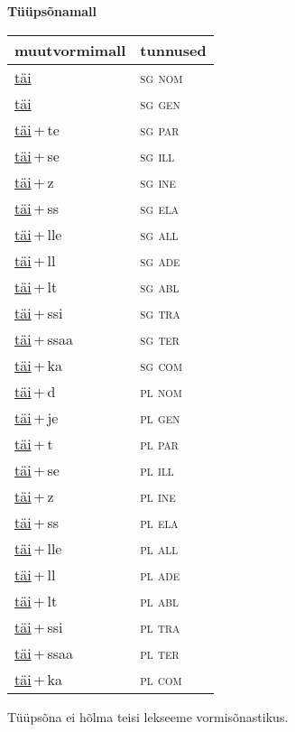 
\vspace{1.8em}
\begin{minipage}{\textwidth}
\textbf{Tüüpsõnamall \,}\\

\begin{sideways}
\begin{tabular}{l l}
muutvormimall & tunnused \\
\hline
\underline{täi} & \textsc{ sg nom } \\
\underline{täi} & \textsc{ sg gen } \\
\underline{täi}\,+\,te & \textsc{ sg par } \\
\underline{täi}\,+\,se & \textsc{ sg ill } \\
\underline{täi}\,+\,z & \textsc{ sg ine } \\
\underline{täi}\,+\,ss & \textsc{ sg ela } \\
\underline{täi}\,+\,lle & \textsc{ sg all } \\
\underline{täi}\,+\,ll & \textsc{ sg ade } \\
\underline{täi}\,+\,lt & \textsc{ sg abl } \\
\underline{täi}\,+\,ssi & \textsc{ sg tra } \\
\underline{täi}\,+\,ssaa & \textsc{ sg ter } \\
\underline{täi}\,+\,ka & \textsc{ sg com } \\
\underline{täi}\,+\,d & \textsc{ pl nom } \\
\underline{täi}\,+\,je & \textsc{ pl gen } \\
\underline{täi}\,+\,t & \textsc{ pl par } \\
\underline{täi}\,+\,se & \textsc{ pl ill } \\
\underline{täi}\,+\,z & \textsc{ pl ine } \\
\underline{täi}\,+\,ss & \textsc{ pl ela } \\
\underline{täi}\,+\,lle & \textsc{ pl all } \\
\underline{täi}\,+\,ll & \textsc{ pl ade } \\
\underline{täi}\,+\,lt & \textsc{ pl abl } \\
\underline{täi}\,+\,ssi & \textsc{ pl tra } \\
\underline{täi}\,+\,ssaa & \textsc{ pl ter } \\
\underline{täi}\,+\,ka & \textsc{ pl com } \\
\end{tabular}
\end{sideways}
\label{tab:tüüpsõnamall-täi}

\end{minipage}

 
\vspace{1em}
\noindent Tüüpsõna ei hõlma teisi lekseeme vormi\-sõnastikus.
